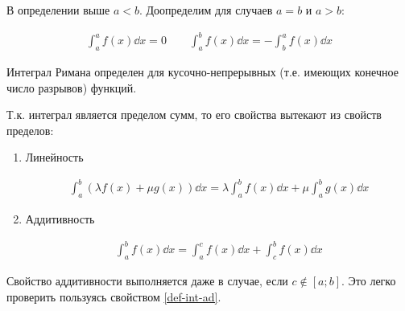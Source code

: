 \begin{remark}\label{def-int-ad}
  В определении выше \(a < b\). Доопределим для случаев \(a = b\) и \(a > b\):

  \begin{align*}
    \int_{a}^{a} f(x) \dd x = 0 \qquad
    \int_{a}^{b} f(x) \dd x = -\int_{b}^{a} f(x) \dd x
  \end{align*}
\end{remark}

\begin{remark}
  Интеграл Римана определен для кусочно-непрерывных (т.е. имеющих конечное
  число разрывов) функций.
\end{remark}

Т.к. интеграл является пределом сумм, то его свойства вытекают из свойств
пределов:
\begin{enumerate}
  \item Линейность
  
  \begin{align*}
    \int_{a}^{b} (\lambda f(x) + \mu g(x)) \dd x =
    \lambda \int_{a}^{b} f(x) \dd x + \mu \int_{a}^{b} g(x) \dd x
  \end{align*}

  \item Аддитивность
  
  \begin{align*}
    \int_{a}^{b} f(x) \dd x =
    \int_{a}^{c} f(x) \dd x + \int_{c}^{b} f(x) \dd x
  \end{align*}
\end{enumerate}

\begin{remark}
  Свойство аддитивности выполняется даже в случае, если \(c \notin [a;b]\). Это
  легко проверить пользуясь свойством \ref{def-int-ad}.
\end{remark}